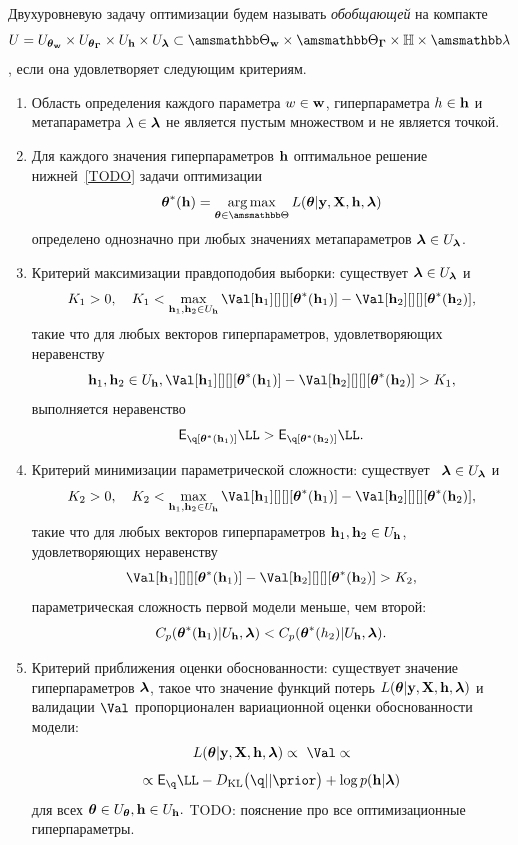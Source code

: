 \begin{defin}
Двухуровневую задачу оптимизации будем называть \textit{обобщающей} на компакте $$U = \Utetaw \times \UtetaG \times \Uh \times \Ulam \subset \Tetawb \times \TetaGb \times \Hb \times \Lamb$$, если она удовлетворяет следующим критериям.
\begin{enumerate}
\item Область определения каждого параметра $w \in \mathbf{w}$, гиперпараметра $h \in \mathbf{h}$ и метапараметра $\lambda \in \boldsymbol{\lambda}$ не  является пустым множеством и не является точкой.
\item Для каждого значения гиперпараметров $\mathbf{h}$ оптимальное решение нижней~\eqref{TODO} задачи оптимизации 
\[
\teta^{*}(\h) = \argmax_{\teta \in \Tetab} \Loss
\]
определено однозначно при любых значениях метапараметров $\boldsymbol{\lambda} \in U_{\boldsymbol{\lambda}}$.

\item Критерий максимизации правдоподобия выборки: существует $\boldsymbol{\lambda} \in U_{\boldsymbol{\lambda}}$ и  $$K_1>0, \quad K_1 < \max_{\h_1,\h_2 \in \Uh} \Val[\h_1][][][\teta^{*}(\h_1)] - \Val[\h_2][][][\teta^{*}(\h_2)],$$ такие что для любых векторов гиперпараметров, удовлетворяющих неравенству $$\h_1, \h_2 \in \Uh, \Val[\h_1][][][\teta^{*}(\h_1)] - \Val[\h_2][][][\teta^{*}(\h_2)] > K_1,$$ выполняется неравенство $$\E_{\q[\teta^{*}(\h_1)]}\LL > \E_{\q[\teta^{*}(\h_2)]}\LL.$$

\item Критерий минимизации параметрической сложности:  существует  $\boldsymbol{\lambda} \in U_{\boldsymbol{\lambda}}$ и $$K_2>0, \quad K_2 < \max_{\h_1, \h_2 \in \Uh} \Val[\h_1][][][\teta^{*}(\h_1)] - \Val[\h_2][][][\teta^{*}(\h_2)],$$ такие что для любых векторов гиперпараметров $\mathbf{h}_1,\mathbf{h}_2 \in U_{\mathbf{h}}$, удовлетворяющих неравенству $$\Val[\h_1][][][\teta^{*}(\h_1)] - \Val[\h_2][][][\teta^{*}(\h_2)]>K_2,$$ параметрическая сложность первой модели меньше, чем второй: $$C_p(\boldsymbol{\theta}^{*}(\mathbf{h}_1)|U_{\mathbf{h}},\boldsymbol{\lambda})<C_p(\boldsymbol{\theta}^{*}(h_2)|U_{\mathbf{h}},\boldsymbol{\lambda}).$$

\item Критерий приближения оценки обоснованности: существует значение гиперпараметров $\boldsymbol{\lambda}$, такое что значение функций потерь $L(\boldsymbol{\theta} |\mathbf{y},\mathbf{X},\mathbf{h},\boldsymbol{\lambda})$ и валидации $\Val$ пропорционален вариационной оценки обоснованности модели: $$\Loss \propto  \Val \propto $$
$$\propto
\E_{\q}\LL - \KL{\q}{\prior} + \log\priorh$$ для всех $\boldsymbol{\theta} \in U_{\boldsymbol{\theta}}, \mathbf{h} \in U_{\mathbf{h}}.$ 
TODO: пояснение про все оптимизационные гиперпараметры.


\end{enumerate}
\end{defin}
